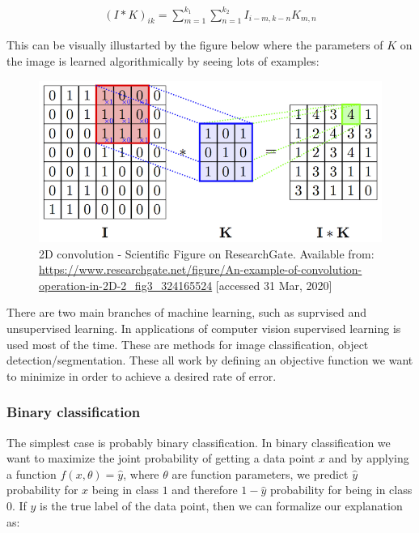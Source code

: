 \documentclass[a4paper,12pt]{article}
\begin{document}
\vspace{4mm}

\begin{align*}
    (I * K)_{ik} = \sum_{m = 1}^{k_1}\sum_{n = 1}^{k_2} I_{i - m, k - n} K_{m, n}
\end{align*}

\vspace{4mm}

\par This can be visually illustarted by the figure below where the parameters of $K$ on the image is learned algorithmically by seeing lots of examples:

\vspace{4mm}

\begin{figure}[H]
    \centering
    \includegraphics[width=0.7\linewidth]{An-example-of-convolution-operation-in-2D-2.png}
    \caption{2D convolution - Scientific Figure on ResearchGate. Available from: \url{https://www.researchgate.net/figure/An-example-of-convolution-operation-in-2D-2_fig3_324165524} [accessed 31 Mar, 2020]}
    \label{fig:2d-conv}
\end{figure}

\vspace{4mm}

\par There are two main branches of machine learning, such as suprvised and unsupervised learning. In applications of computer vision supervised learning is used most of the time. These are methods for image classification, object detection/segmentation. These all work by defining an objective function we want to minimize in order to achieve a desired rate of error. 

\subsubsection{Binary classification}

\par The simplest case is probably binary classification. In binary classification we want to maximize the joint probability of getting a data point $x$ and by applying a function $f(x, \theta) = \hat{y}$, where $\theta$ are function parameters, we predict $\hat{y}$ probability for $x$ being in class $1$ and therefore $1 - \hat{y}$ probability for being in class $0$. If $y$ is the true label of the data point, then we can formalize our explanation as:
\end{document}
